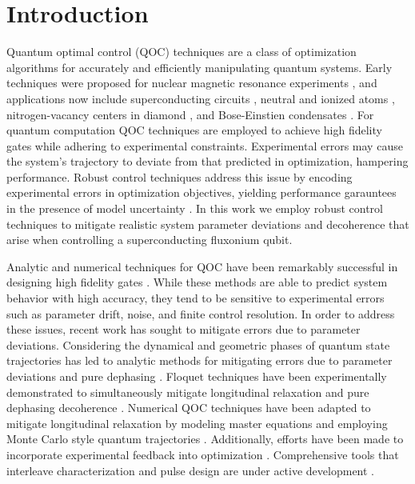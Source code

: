 \section{Introduction}
Quantum optimal control (QOC) techniques are a class of optimization
algorithms for accurately and efficiently manipulating quantum systems.
Early techniques were proposed for nuclear magnetic resonance experiments
\cite{khaneja2005optimal}, and applications now include superconducting
circuits \cite{heeres2017implementing,
  huang2020engineering, leng2019robust, leung2017speedup, xu2020nonadiabatic},
neutral and ionized atoms \cite{van2016optimal}, nitrogen-vacancy centers in
diamond \cite{rembold2020introduction}, and Bose-Einstien condensates
\cite{sorensen2018quantum}.
For quantum computation
QOC techniques are employed to achieve high fidelity gates
while adhering to experimental constraints.
Experimental errors may cause the system's trajectory to deviate from that predicted in
optimization, hampering performance.
Robust control techniques 
address this issue by encoding
experimental errors in optimization objectives, yielding performance
garauntees in the presence of model uncertainty \cite{Zhou97,Morimoto00,Manchester18}.
In this work we employ robust control techniques to mitigate
realistic system parameter deviations and decoherence that arise when controlling
a superconducting fluxonium qubit.

Analytic and numerical techniques for QOC have been remarkably successful in
designing high fidelity gates . 
While these methods are able to predict system behavior with high accuracy, they tend 
to be sensitive to experimental errors such as parameter drift, noise, and finite control 
resolution. 
In order to address these issues,
recent work has sought to mitigate
errors due to parameter deviations.
Considering the dynamical and geometric phases of quantum state
trajectories has led to analytic methods for mitigating
errors due to parameter deviations and pure dephasing
\cite{han2020experimental, merrill2014progress, xu2020nonadiabatic, zhang2020universal}.
Floquet techniques have been experimentally demonstrated to simultaneously mitigate
longitudinal relaxation and pure dephasing decoherence
\cite{huang2020engineering, mundada2020floquet}.
Numerical QOC techniques have been adapted to mitigate longitudinal relaxation
by modeling master equations \cite{rembold2020introduction} and employing
Monte Carlo style quantum trajectories \cite{abdelhafez2019gradient}.
Additionally, efforts have been made to incorporate experimental feedback
into optimization \cite{huang2020engineering}. Comprehensive tools that interleave characterization
and pulse design are under active development \cite{wittler2020integrated}.

